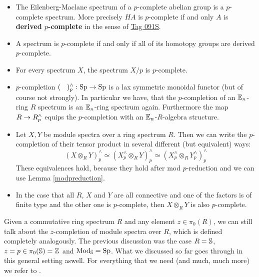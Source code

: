 \begin{itemize}
    \item The Eilenberg-Maclane spectrum of a $p$-complete abelian group is a $p$-complete spectrum. More precisely $HA$ is $p$-complete if and only $A$ is \textbf{derived $p$-complete} in the sense of \href{https://stacks.math.columbia.edu/tag/091S}{Tag 091S}.
    \item A spectrum is $p$-complete if and only if all of its homotopy groups are derived $p$-complete.
    \item For every spectrum $X$, the spectrum $X/p$ is $p$-complete.
    \item $p$-completion $(\phantom{X})^{\wedge}_p:\Sp\to\Sp$ is a lax symmetric monoidal functor (but of course not strongly).
    In particular we have, that the $p$-completion of an $\En$-ring $R$ spectrum is an $\En$-ring spectrum again. Furthermore the map $R\ra R_p^{\wedge}$ equips the $p$-completion with an $\En$-$R$-algebra structure.
    \item Let $X,Y$ be module spectra over a ring spectrum $R$. Then we can write the $p$-completion of their tensor product in several different (but equivalent) ways:
    \begin{equation*}
        \left( X\otimes_R Y \right)_p^{\wedge}\simeq\left( X_p^{\wedge}\otimes_R Y \right)_p^{\wedge} \simeq\left( X_p^{\wedge}\otimes_R Y_p^{\wedge} \right)_p^{\wedge} 
    \end{equation*}
    These equivalences hold, because they hold after mod $p$-reduction and we can use Lemma \ref{modpreduction}.
    \item In the case that all $R$, $X$ and $Y$ are all connective and one of the factors is of finite type and the other one is $p$-complete, then $X\otimes_R Y$ is also $p$-complete. %
\end{itemize}
Given a commutative ring spectrum $R$ and any element $z\in\pi_0(R)$, we can still talk about the $z$-completion of module spectra over $R$, which is defined completely analogously. The previous discussion was the case $R=\S$, $z=p\in\pi_0(\S)=\Z$ and $\Mod_\S=\Sp$. What we discussed so far goes through in this general setting aswell. For everything that we need (and much, much more) we refer to \cite[Section~7.3]{SAG}.

